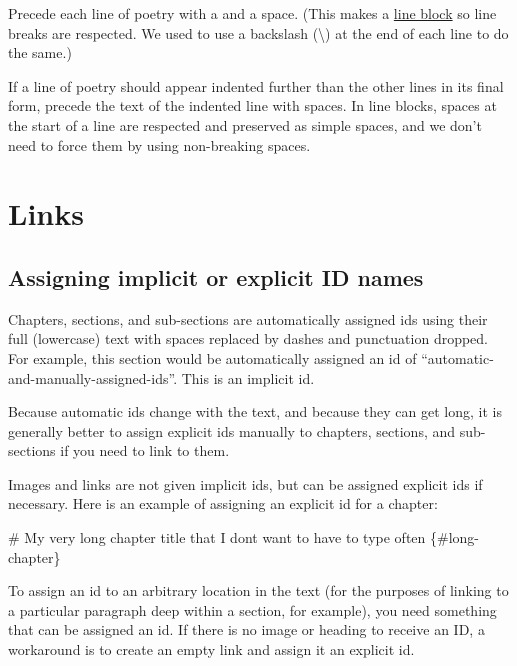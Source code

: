 \documentclass[
]{book}
\newenvironment{Shaded}{\begin{snugshade}}{\end{snugshade}}
\newcommand{\FunctionTok}[1]{\textcolor[rgb]{0.00,0.00,0.00}{#1}}
\begin{document}
Precede each line of poetry with a \textbar{} and a space. (This makes a \href{https://pandoc.org/MANUAL.html\#line-blocks}{line block} so line breaks are respected. We used to use a backslash (\textbackslash) at the end of each line to do the same.)

If a line of poetry should appear indented further than the other lines in its final form, precede the text of the indented line with spaces. In line blocks, spaces at the start of a line are respected and preserved as simple spaces, and we don't need to force them by using non-breaking spaces.

\hypertarget{links}{%
\chapter{Links}\label{links}}

\hypertarget{assigning-ids}{%
\section{Assigning implicit or explicit ID names}\label{assigning-ids}}

Chapters, sections, and sub-sections are automatically assigned ids using their full (lowercase) text with spaces replaced by dashes and punctuation dropped. For example, this section would be automatically assigned an id of ``automatic-and-manually-assigned-ids''. This is an implicit id.

Because automatic ids change with the text, and because they can get long, it is generally better to assign explicit ids manually to chapters, sections, and sub-sections if you need to link to them.

Images and links are not given implicit ids, but can be assigned explicit ids if necessary. Here is an example of assigning an explicit id for a chapter:

\begin{Shaded}
\begin{Highlighting}[]
\FunctionTok{\# My very long chapter title that I don\textquotesingle{}t want to have to type often \{\#long{-}chapter\}}
\end{Highlighting}
\end{Shaded}

To assign an id to an arbitrary location in the text (for the purposes of linking to a particular paragraph deep within a section, for example), you need something that can be assigned an id. If there is no image or heading to receive an ID, a workaround is to create an empty link and assign it an explicit id.
\end{document}
